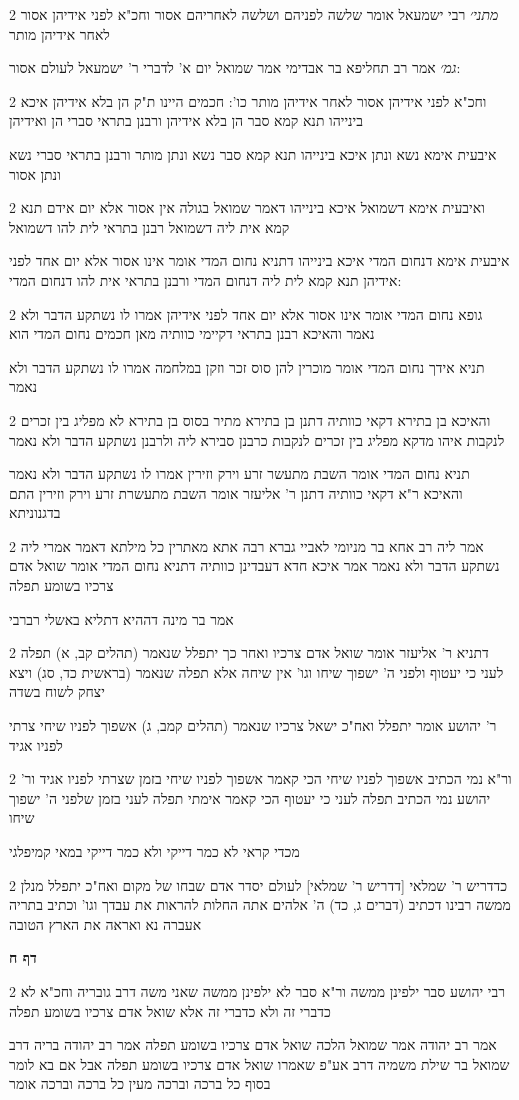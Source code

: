 \documentclass[12pt, openany]{book}
\newcommand{\sethebfont}{
\fontsize{10.5pt}{21.0pt} \selectfont
}
\newcommand{\twocol}[1]{
	{\sethebfont \begin{multicols}{2}
			#1
	\end{multicols}}	
}
\newcommand{\sectname}{}
\newcommand{\newsection}[1]{
	\addcontentsline{toc}{section}{#1}
	\renewcommand{\sectname}{#1}	
	\vspace{-\baselineskip}
	\begin{center}
		\textbf{%
\fontsize{16pt}{16pt}\selectfont
			#1}
	\end{center}
	\vspace{-\baselineskip}
	\nopagebreak
}
\begin{document}
\twocol{{\large\emph{מתני׳}} רבי ישמעאל אומר שלשה לפניהם ושלשה לאחריהם אסור וחכ"א לפני אידיהן אסור לאחר אידיהן מותר
\par {\large\emph{גמ׳}} אמר רב תחליפא בר אבדימי אמר שמואל יום א' לדברי ר' ישמעאל לעולם אסור:}
\twocol{וחכ"א לפני אידיהן אסור לאחר אידיהן מותר כו': חכמים היינו ת"ק הן בלא אידיהן איכא בינייהו תנא קמא סבר הן בלא אידיהן ורבנן בתראי סברי הן ואידיהן
\par איבעית אימא נשא ונתן איכא בינייהו תנא קמא סבר נשא ונתן מותר ורבנן בתראי סברי נשא ונתן אסור}
\twocol{ואיבעית אימא דשמואל איכא בינייהו דאמר שמואל בגולה אין אסור אלא יום אידם תנא קמא אית ליה דשמואל רבנן בתראי לית להו דשמואל
\par איבעית אימא דנחום המדי איכא בינייהו דתניא נחום המדי אומר אינו אסור אלא יום אחד לפני אידיהן תנא קמא לית ליה דנחום המדי ורבנן בתראי אית להו דנחום המדי:}
\twocol{גופא נחום המדי אומר אינו אסור אלא יום אחד לפני אידיהן אמרו לו נשתקע הדבר ולא נאמר והאיכא רבנן בתראי דקיימי כוותיה מאן חכמים נחום המדי הוא
\par תניא אידך נחום המדי אומר מוכרין להן סוס זכר וזקן במלחמה אמרו לו נשתקע הדבר ולא נאמר}
\twocol{והאיכא בן בתירא דקאי כוותיה דתנן בן בתירא מתיר בסוס בן בתירא לא מפליג בין זכרים לנקבות איהו מדקא מפליג בין זכרים לנקבות כרבנן סבירא ליה ולרבנן נשתקע הדבר ולא נאמר
\par תניא נחום המדי אומר השבת מתעשר זרע וירק וזירין אמרו לו נשתקע הדבר ולא נאמר והאיכא ר"א דקאי כוותיה דתנן ר' אליעזר אומר השבת מתעשרת זרע וירק וזירין התם בדגנוניתא}
\twocol{אמר ליה רב אחא בר מניומי לאביי גברא רבה אתא מאתרין כל מילתא דאמר אמרי ליה נשתקע הדבר ולא נאמר אמר איכא חדא דעבדינן כוותיה דתניא נחום המדי אומר שואל אדם צרכיו בשומע תפלה
\par אמר בר מינה דההיא דתליא באשלי רברבי}
\twocol{דתניא ר' אליעזר אומר שואל אדם צרכיו ואחר כך יתפלל שנאמר (תהלים קב, א) תפלה לעני כי יעטוף ולפני ה' ישפוך שיחו וגו' אין שיחה אלא תפלה שנאמר (בראשית כד, סג) ויצא יצחק לשוח בשדה
\par ר' יהושע אומר יתפלל ואח"כ ישאל צרכיו שנאמר (תהלים קמב, ג) אשפוך לפניו שיחי צרתי לפניו אגיד}
\twocol{ור"א נמי הכתיב אשפוך לפניו שיחי הכי קאמר אשפוך לפניו שיחי בזמן שצרתי לפניו אגיד ור' יהושע נמי הכתיב תפלה לעני כי יעטוף הכי קאמר אימתי תפלה לעני בזמן שלפני ה' ישפוך שיחו
\par מכדי קראי לא כמר דייקי ולא כמר דייקי במאי קמיפלגי}
\twocol{כדדריש ר' שמלאי [דדריש ר' שמלאי] לעולם יסדר אדם שבחו של מקום ואח"כ יתפלל מנלן ממשה רבינו דכתיב (דברים ג, כד) ה' אלהים אתה החלות להראות את עבדך וגו' וכתיב בתריה אעברה נא ואראה את הארץ הטובה}
\newsection{דף ח}
\twocol{רבי יהושע סבר ילפינן ממשה ור"א סבר לא ילפינן ממשה שאני משה דרב גובריה וחכ"א לא כדברי זה ולא כדברי זה אלא שואל אדם צרכיו בשומע תפלה
\par אמר רב יהודה אמר שמואל הלכה שואל אדם צרכיו בשומע תפלה אמר רב יהודה בריה דרב שמואל בר שילת משמיה דרב אע"פ שאמרו שואל אדם צרכיו בשומע תפלה אבל אם בא לומר בסוף כל ברכה וברכה מעין כל ברכה וברכה אומר}
\end{document}
